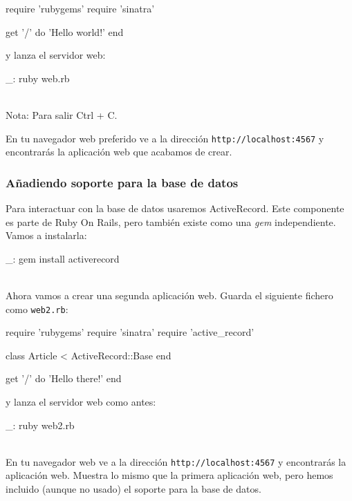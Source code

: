 \begin{rubycode}
require 'rubygems'
require 'sinatra'

get '/' do
  'Hello world!'
end
\end{rubycode}

y lanza el servidor web:

\begin{bashcode}
_: ruby web.rb
\end{bashcode}
\\

Nota: Para salir Ctrl + C.

En tu navegador web preferido ve a la dirección \texttt{http://localhost:4567} y encontrarás la aplicación web que acabamos de crear.


\subsubsection{Añadiendo soporte para la base de datos}

Para interactuar con la base de datos usaremos ActiveRecord. Este componente es parte de Ruby On Rails, pero también existe como una \emph{gem} independiente. Vamos a instalarla:

\begin{bashcode}
_: gem install activerecord
\end{bashcode}
\\

Ahora vamos a crear una segunda aplicación web. Guarda el siguiente fichero como \texttt{web2.rb}:

\begin{rubycode}
require 'rubygems'
require 'sinatra'
require 'active_record'

class Article < ActiveRecord::Base
end

get '/' do
   'Hello there!'
end
\end{rubycode}

y lanza el servidor web como antes:

\begin{bashcode}
_: ruby web2.rb
\end{bashcode}
\\

En tu navegador web ve a la dirección \texttt{http://localhost:4567} y encontrarás la aplicación web. Muestra lo mismo que la primera aplicación web, pero hemos incluido (aunque no usado) el soporte para la base de datos.


